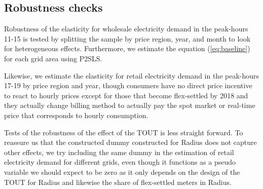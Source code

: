 \subsection{Robustness checks}
\label{subsec:e_robustness}
Robustness of the elasticity for wholesale electricity demand in the peak-hours 11-15 is tested by splitting the sample by price region, year, and month to look for heterogeneous effects. Furthermore, we estimate the equation (\ref{eq:baseline}) for each grid area using P2SLS.
\par
Likewise, we estimate the elasticity for retail electricity demand in the peak-hours 17-19 by price region and year, though consumers have no direct price incentive to react to hourly prices except for those that become flex-settled by 2018 and they actually change billing method to actually pay the spot market or real-time price that corresponds to hourly consumption.
\bigskip\par
Tests of the robustness of the effect of the TOUT is less straight forward. To reassure us that the constructed dummy constructed for Radius does not capture other effects, we try including the same dummy in the estimation of retail electricity demand for different grids, even though it functions as a pseudo variable we should expect to be zero as it only depends on the design of the TOUT for Radius and likewise the share of flex-settled meters in Radius.
